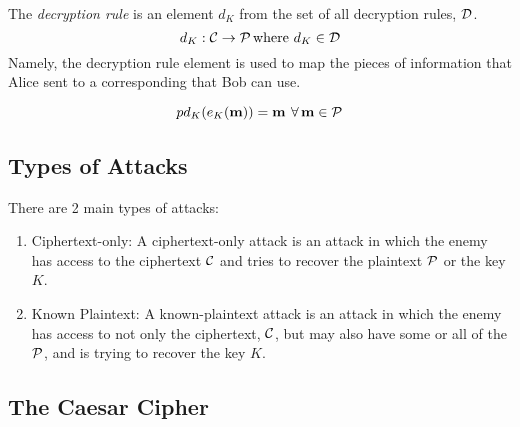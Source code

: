 \begin{definition}\label{def:Decryption_Rule}
  The \emph{decryption rule} is an element $d_{K}$ from the set of all decryption rules, $\operatorname{\mathcal{D}}$.
  \begin{equation}\label{eq:Decryption_Rule}
    d_{K} : \operatorname{\mathcal{C}} \rightarrow \operatorname{\mathcal{P}} \text{where } d_{K} \in \operatorname{\mathcal{D}}
  \end{equation}
  Namely, the decryption rule element is used to map the  pieces of information that Alice sent to a corresponding  that Bob can use.

  \begin{remark}
    \begin{equation}\label{eq:Decrypt_Encryption}
p      d_{K}(e_{K}(\operatorname{\mathbf{m}})) = \operatorname{\mathbf{m}} \: \forall \operatorname{\mathbf{m}} \in \operatorname{\mathcal{P}}
    \end{equation}
  \end{remark}
\end{definition}

\subsection{Types of Attacks}\label{subsec:Attack_Types}
There are 2 main types of attacks:
\begin{enumerate}[noitemsep]
\item Ciphertext-only: A ciphertext-only attack is an attack in which the enemy has access to the ciphertext $\operatorname{\mathcal{C}}$ and tries to recover the plaintext $\operatorname{\mathcal{P}}$ or the key $K$.
\item Known Plaintext: A known-plaintext attack is an attack in which the enemy has access to not only the ciphertext, $\operatorname{\mathcal{C}}$, but may also have some or all of the $\operatorname{\mathcal{P}}$, and is trying to recover the key $K$.
\end{enumerate}

\subsection{The Caesar Cipher}\label{subsec:The_Caesar_Cipher}
